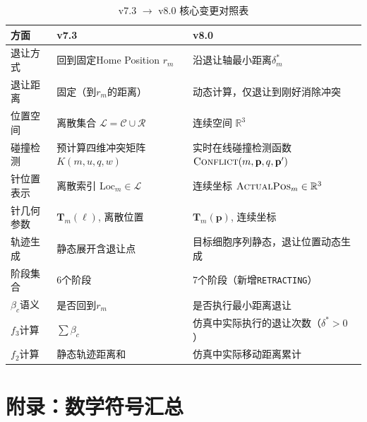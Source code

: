 \documentclass[11pt,a4paper]{article}
\begin{document}
\begin{table}[H]
\centering
\small
\begin{tabular}{|l|p{5.5cm}|p{5.5cm}|}
\hline
\textbf{方面} & \textbf{v7.3} & \textbf{v8.0} \\
\hline
退让方式 & 回到固定Home Position $r_m$ & 沿退让轴最小距离$\delta_m^*$ \\
\hline
退让距离 & 固定（到$r_m$的距离） & 动态计算，仅退让到刚好消除冲突 \\
\hline
位置空间 & 离散集合 $\mathcal{L} = \mathcal{C} \cup \mathcal{R}$ & 连续空间 $\mathbb{R}^3$ \\
\hline
碰撞检测 & 预计算四维冲突矩阵 $K(m,u,q,w)$ & 实时在线碰撞检测函数 $\textsc{Conflict}(m,\mathbf{p},q,\mathbf{p}')$ \\
\hline
针位置表示 & 离散索引 $\text{Loc}_m \in \mathcal{L}$ & 连续坐标 $\textsc{ActualPos}_m \in \mathbb{R}^3$ \\
\hline
针几何参数 & $\mathbf{T}_m(\ell)$, 离散位置 & $\mathbf{T}_m(\mathbf{p})$, 连续坐标 \\
\hline
轨迹生成 & 静态展开含退让点 & 目标细胞序列静态，退让位置动态生成 \\
\hline
阶段集合 & 6个阶段 & 7个阶段（新增\texttt{RETRACTING}） \\
\hline
$\beta_c$语义 & 是否回到$r_m$ & 是否执行最小距离退让 \\
\hline
$f_3$计算 & $\sum \beta_c$ & 仿真中实际执行的退让次数（$\delta^*>0$） \\
\hline
$f_2$计算 & 静态轨迹距离和 & 仿真中实际移动距离累计 \\
\hline
\end{tabular}
\caption{v7.3 $\to$ v8.0 核心变更对照表}
\end{table}

\section{附录：数学符号汇总}
\end{document}

